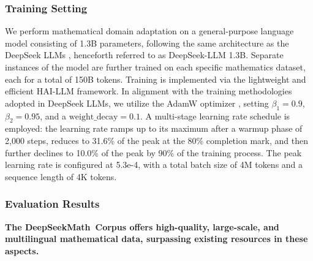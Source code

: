 \subsubsection{Training Setting}
\label{sec:quality-policy}
We perform mathematical domain adaptation on a general-purpose language model consisting of 1.3B parameters, following the same architecture as the DeepSeek LLMs \citep{deepseek-llm}, henceforth referred to as DeepSeek-LLM 1.3B. Separate instances of the model are further trained on each specific mathematics dataset, each for a total of 150B tokens. Training is implemented via the lightweight and efficient HAI-LLM \citep{haillm} framework. In alignment with the training methodologies adopted in DeepSeek LLMs, we utilize the AdamW optimizer \citep{adamW}, setting $\beta_1=0.9$, $\beta_2=0.95$, and a $\mathrm{weight\_decay}=0.1$. A multi-stage learning rate schedule is employed: the learning rate ramps up to its maximum after a warmup phase of 2,000 steps, reduces to 31.6\% of the peak at the 80\% completion mark, and then further declines to 10.0\% of the peak by 90\% of the training process. The peak learning rate is configured at 5.3e-4, with a total batch size of 4M tokens and a sequence length of 4K tokens.

\subsubsection{Evaluation Results}

\textbf{The DeepSeekMath~Corpus offers high-quality, large-scale, and multilingual mathematical data, surpassing existing resources in these aspects.}

